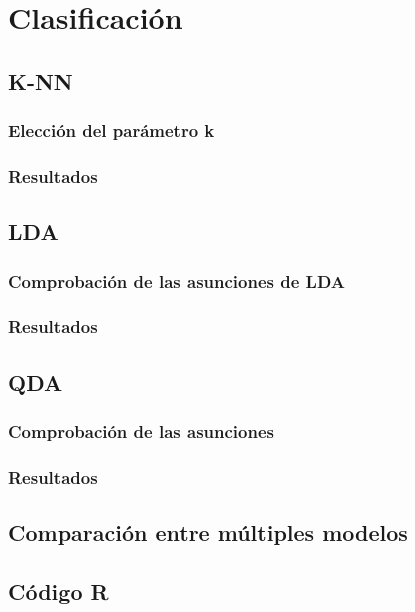 \section{Clasificación}

\subsection{K-NN}

\subsubsection{Elección del parámetro k}

\subsubsection{Resultados}

\subsection{LDA}

\subsubsection{Comprobación de las asunciones de LDA}

\subsubsection{Resultados}

\subsection{QDA}

\subsubsection{Comprobación de las asunciones}

\subsubsection{Resultados}


\subsection{Comparación entre múltiples modelos}


\subsection{Código R}

